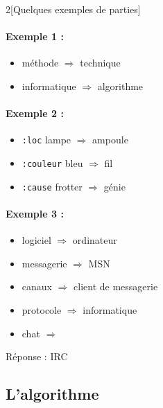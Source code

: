 \begin{multicols}{2}[Quelques exemples de parties]
	\paragraph{Exemple 1 :}
	\begin{itemize}
		\item méthode $\Rightarrow$ technique
		\item informatique $\Rightarrow$ algorithme \checkmark
	\end{itemize}
	
	\paragraph{Exemple 2 :}
	\begin{itemize}
		\item \texttt{:loc} lampe $\Rightarrow$ ampoule
		\item \texttt{:couleur} bleu $\Rightarrow$ fil
		\item \texttt{:cause} frotter $\Rightarrow$ génie \checkmark
	\end{itemize}
	
	\paragraph{Exemple 3 :}
	\begin{itemize}
		\item logiciel $\Rightarrow$ ordinateur
		\item messagerie $\Rightarrow$ MSN
		\item canaux $\Rightarrow$ client de messagerie
		\item protocole $\Rightarrow$ informatique
		\item chat $\Rightarrow$ \XBox
	\end{itemize}
	Réponse : IRC
\end{multicols}

\subsection{L'algorithme}
\label{sec:revueAlgorithme}

